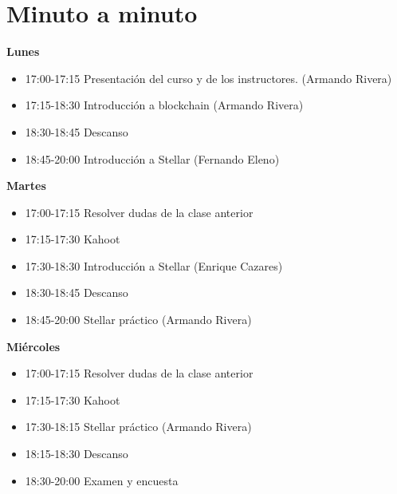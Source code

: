 \documentclass[a4paper,12pt]{/home/armando/Documentos/Cursos/LaTeX/Plantillas/lib/pub}
\begin{document}
\putLogo
\protecoTitle

\section{Minuto a minuto}
\textbf{Lunes}
\begin{itemize}
	\item 17:00-17:15 Presentación del curso y de los instructores. (Armando Rivera)
	\item 17:15-18:30 Introducción a blockchain (Armando Rivera)
	\item 18:30-18:45 Descanso
	\item 18:45-20:00 Introducción a Stellar (Fernando Eleno)
\end{itemize}
\textbf{Martes}
\begin{itemize}
	\item 17:00-17:15 Resolver dudas de la clase anterior
	\item 17:15-17:30 Kahoot
	\item 17:30-18:30 Introducción a Stellar (Enrique Cazares)
	\item 18:30-18:45 Descanso
	\item 18:45-20:00 Stellar práctico (Armando Rivera)
\end{itemize}
\textbf{Miércoles}
\begin{itemize}
	\item 17:00-17:15 Resolver dudas de la clase anterior
	\item 17:15-17:30 Kahoot
	\item 17:30-18:15 Stellar práctico (Armando Rivera)
	\item 18:15-18:30 Descanso
	\item 18:30-20:00 Examen y encuesta
\end{itemize}
\end{document}
